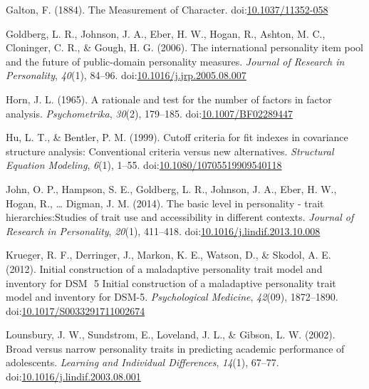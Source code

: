 \documentclass[,man,floatsintext]{apa6}
\theoremstyle{definition}
\theoremstyle{definition}
\theoremstyle{definition}
\theoremstyle{remark}
\begin{document}
\leavevmode\hypertarget{ref-Galton1884}{}%
Galton, F. (1884). The Measurement of Character.
doi:\href{https://doi.org/10.1037/11352-058}{10.1037/11352-058}

\leavevmode\hypertarget{ref-Goldberg2006}{}%
Goldberg, L. R., Johnson, J. A., Eber, H. W., Hogan, R., Ashton, M. C.,
Cloninger, C. R., \& Gough, H. G. (2006). The international personality
item pool and the future of public-domain personality measures.
\emph{Journal of Research in Personality}, \emph{40}(1), 84--96.
doi:\href{https://doi.org/10.1016/j.jrp.2005.08.007}{10.1016/j.jrp.2005.08.007}

\leavevmode\hypertarget{ref-Horn1965}{}%
Horn, J. L. (1965). A rationale and test for the number of factors in
factor analysis. \emph{Psychometrika}, \emph{30}(2), 179--185.
doi:\href{https://doi.org/10.1007/BF02289447}{10.1007/BF02289447}

\leavevmode\hypertarget{ref-Hu1999}{}%
Hu, L. T., \& Bentler, P. M. (1999). Cutoff criteria for fit indexes in
covariance structure analysis: Conventional criteria versus new
alternatives. \emph{Structural Equation Modeling}, \emph{6}(1), 1--55.
doi:\href{https://doi.org/10.1080/10705519909540118}{10.1080/10705519909540118}

\leavevmode\hypertarget{ref-Ziegler2014}{}%
John, O. P., Hampson, S. E., Goldberg, L. R., Johnson, J. A., Eber, H.
W., Hogan, R., \ldots{} Digman, J. M. (2014). The basic level in
personality - trait hierarchies:Studies of trait use and accessibility
in different contexts. \emph{Journal of Research in Personality},
\emph{20}(1), 411--418.
doi:\href{https://doi.org/10.1016/j.lindif.2013.10.008}{10.1016/j.lindif.2013.10.008}

\leavevmode\hypertarget{ref-Krueger2012a}{}%
Krueger, R. F., Derringer, J., Markon, K. E., Watson, D., \& Skodol, A.
E. (2012). Initial construction of a maladaptive personality trait model
and inventory for DSM ­ 5 Initial construction of a maladaptive
personality trait model and inventory for DSM-5. \emph{Psychological
Medicine}, \emph{42}(09), 1872--1890.
doi:\href{https://doi.org/10.1017/S0033291711002674}{10.1017/S0033291711002674}

\leavevmode\hypertarget{ref-Lounsbury2002}{}%
Lounsbury, J. W., Sundstrom, E., Loveland, J. L., \& Gibson, L. W.
(2002). Broad versus narrow personality traits in predicting academic
performance of adolescents. \emph{Learning and Individual Differences},
\emph{14}(1), 67--77.
doi:\href{https://doi.org/10.1016/j.lindif.2003.08.001}{10.1016/j.lindif.2003.08.001}
\end{document}
